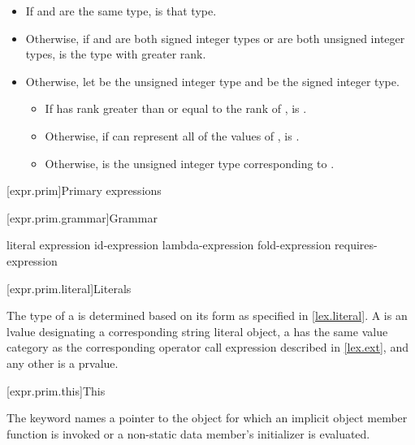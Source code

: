 \begin{itemize}
\begin{itemize}
\item If  and  are the same type,  is that type.

\item Otherwise, if  and  are both signed integer types or
are both unsigned integer types,
 is the type with greater rank.

\item Otherwise, let  be the unsigned integer type and
 be the signed integer type.
\begin{itemize}
\item If  has rank greater than or equal to the rank of ,
 is .
\item Otherwise, if  can represent all of the values of ,
 is .
\item Otherwise,
 is the unsigned integer type corresponding to .
\end{itemize}
\end{itemize}
\end{itemize}

[expr.prim]{Primary expressions}%

[expr.prim.grammar]{Grammar}

\begin{bnf}
\br
    literal\br
    \br
    \terminal{(} expression \terminal{)}\br
    id-expression\br
    lambda-expression\br
    fold-expression\br
    requires-expression
\end{bnf}

[expr.prim.literal]{Literals}

\pnum
{}%
%
The type of a 
is determined based on its form as specified in \ref{lex.literal}.
A  is an lvalue
designating a corresponding string literal object,
a 
has the same value category
as the corresponding operator call expression described in \ref{lex.ext},
and any other  is a prvalue.

[expr.prim.this]{This}

\pnum
{}%
The keyword  names a pointer to the object for which an implicit object member
function is invoked or a non-static data member's
initializer is evaluated.

